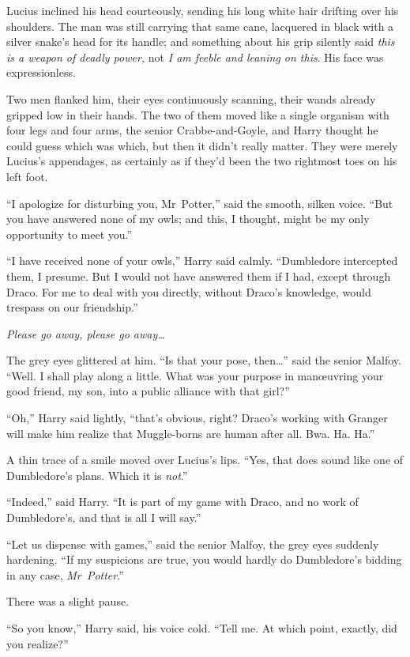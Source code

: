 Lucius inclined his head courteously, sending his long white hair drifting over his shoulders. The man was still carrying that same cane, lacquered in black with a silver snake’s head for its handle; and something about his grip silently said \emph{this is a weapon of deadly power,} not \emph{I am feeble and leaning on this}. His face was expressionless.

Two men flanked him, their eyes continuously scanning, their wands already gripped low in their hands. The two of them moved like a single organism with four legs and four arms, the senior Crabbe-and-Goyle, and Harry thought he could guess which was which, but then it didn’t really matter. They were merely Lucius’s appendages, as certainly as if they’d been the two rightmost toes on his left foot.

“I apologize for disturbing you, Mr~Potter,” said the smooth, silken voice. “But you have answered none of my owls; and this, I thought, might be my only opportunity to meet you.”

“I have received none of your owls,” Harry said calmly. “Dumbledore intercepted them, I presume. But I would not have answered them if I had, except through Draco. For me to deal with you directly, without Draco’s knowledge, would trespass on our friendship.”

\emph{Please go away, please go away…}

The grey eyes glittered at him. “Is that your pose, then…” said the senior Malfoy. “Well. I shall play along a little. What was your purpose in manœuvring your good friend, my son, into a public alliance with that girl?”

“Oh,” Harry said lightly, “that’s obvious, right? Draco’s working with Granger will make him realize that Muggle-borns are human after all. Bwa. Ha. Ha.”

A thin trace of a smile moved over Lucius’s lips. “Yes, that does sound like one of Dumbledore’s plans. Which it is \emph{not}.”

“Indeed,” said Harry. “It is part of my game with Draco, and no work of Dumbledore’s, and that is all I will say.”

“Let us dispense with games,” said the senior Malfoy, the grey eyes suddenly hardening. “If my suspicions are true, you would hardly do Dumbledore’s bidding in any case, \emph{Mr~Potter}.”

There was a slight pause.

“So you know,” Harry said, his voice cold. “Tell me. At which point, exactly, did you realize?”

